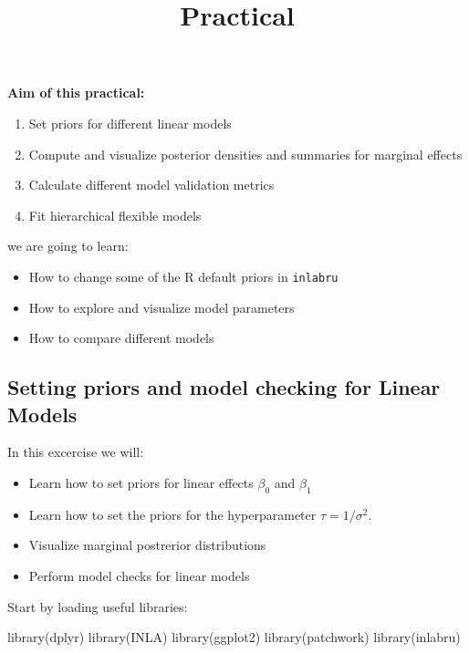 \documentclass[
  letterpaper,
  DIV=11,
  numbers=noendperiod]{scrartcl}
\title{Practical}
\author{}
\date{}
\makeatletter
\newenvironment{Shaded}{\begin{snugshade}}{\end{snugshade}}
\newcommand{\FunctionTok}[1]{\textcolor[rgb]{0.28,0.35,0.67}{#1}}
\newcommand{\NormalTok}[1]{\textcolor[rgb]{0.00,0.23,0.31}{#1}}
\providecommand{\tightlist}{%
  \setlength{\itemsep}{0pt}\setlength{\parskip}{0pt}}\usepackage{longtable,booktabs,array}
\renewcommand{\maketitle}{\bgroup\setlength{\parindent}{0pt}
\begin{flushleft}
  {\sffamily\huge\textbf{\MakeUppercase{\@title}}} \vspace{0.3cm} \newline
  {\Large {\@subtitle}} \newline
  \@author
\end{flushleft}\egroup
}
\makeatother
\begin{document}
\maketitle

\pagestyle{mystyle}

\textbf{Aim of this practical:}

\begin{enumerate}
\def\labelenumi{\arabic{enumi}.}
\tightlist
\item
  Set priors for different linear models
\item
  Compute and visualize posterior densities and summaries for marginal
  effects
\item
  Calculate different model validation metrics
\item
  Fit hierarchical flexible models
\end{enumerate}

we are going to learn:

\begin{itemize}
\tightlist
\item
  How to change some of the R default priors in \texttt{inlabru}
\item
  How to explore and visualize model parameters
\item
  How to compare different models
\end{itemize}

\subsection{Setting priors and model checking for Linear
Models}\label{setting-priors-and-model-checking-for-linear-models}

In this excercise we will:

\begin{itemize}
\tightlist
\item
  Learn how to set priors for linear effects \(\beta_0\) and \(\beta_1\)
\item
  Learn how to set the priors for the hyperparameter
  \(\tau = 1/\sigma^2\).
\item
  Visualize marginal postrerior distributions
\item
  Perform model checks for linear models
\end{itemize}

Start by loading useful libraries:

\begin{Shaded}
\begin{Highlighting}[]
\FunctionTok{library}\NormalTok{(dplyr)}
\FunctionTok{library}\NormalTok{(INLA)}
\FunctionTok{library}\NormalTok{(ggplot2)}
\FunctionTok{library}\NormalTok{(patchwork)}
\FunctionTok{library}\NormalTok{(inlabru)     }
\end{Highlighting}
\end{Shaded}
\end{document}
